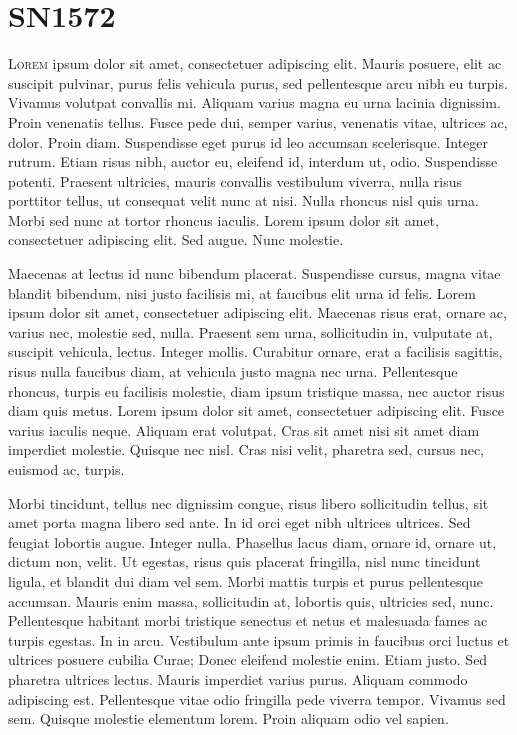 \chapter{SN1572}
\label{chap:two}

\lettrine[lines=4]{L}{orem} ipsum dolor sit amet, consectetuer
adipiscing elit. Mauris posuere, elit ac suscipit pulvinar, purus
felis vehicula purus, sed pellentesque arcu nibh eu turpis. Vivamus
volutpat convallis mi. Aliquam varius magna eu urna lacinia
dignissim. Proin venenatis tellus. Fusce pede dui, semper varius,
venenatis vitae, ultrices ac, dolor. Proin diam. Suspendisse eget
purus id leo accumsan scelerisque. Integer rutrum. Etiam risus nibh,
auctor eu, eleifend id, interdum ut, odio. Suspendisse
potenti. Praesent ultricies, mauris convallis vestibulum viverra,
nulla risus porttitor tellus, ut consequat velit nunc at nisi. Nulla
rhoncus nisl quis urna. Morbi sed nunc at tortor rhoncus
iaculis. Lorem ipsum dolor sit amet, consectetuer adipiscing elit. Sed
augue. Nunc molestie.

Maecenas at lectus id nunc bibendum placerat. Suspendisse cursus,
magna vitae blandit bibendum, nisi justo facilisis mi, at faucibus
elit urna id felis. Lorem ipsum dolor sit amet, consectetuer
adipiscing elit. Maecenas risus erat, ornare ac, varius nec, molestie
sed, nulla. Praesent sem urna, sollicitudin in, vulputate at, suscipit
vehicula, lectus. Integer mollis. Curabitur ornare, erat a facilisis
sagittis, risus nulla faucibus diam, at vehicula justo magna nec
urna. Pellentesque rhoncus, turpis eu facilisis molestie, diam ipsum
tristique massa, nec auctor risus diam quis metus. Lorem ipsum dolor
sit amet, consectetuer adipiscing elit. Fusce varius iaculis
neque. Aliquam erat volutpat. Cras sit amet nisi sit amet diam
imperdiet molestie. Quisque nec nisl. Cras nisi velit, pharetra sed,
cursus nec, euismod ac, turpis.

Morbi tincidunt, tellus nec dignissim congue, risus libero
sollicitudin tellus, sit amet porta magna libero sed ante. In id orci
eget nibh ultrices ultrices. Sed feugiat lobortis augue. Integer
nulla. Phasellus lacus diam, ornare id, ornare ut, dictum non,
velit. Ut egestas, risus quis placerat fringilla, nisl nunc tincidunt
ligula, et blandit dui diam vel sem. Morbi mattis turpis et purus
pellentesque accumsan. Mauris enim massa, sollicitudin at, lobortis
quis, ultricies sed, nunc. Pellentesque habitant morbi tristique
senectus et netus et malesuada fames ac turpis egestas. In in
arcu. Vestibulum ante ipsum primis in faucibus orci luctus et ultrices
posuere cubilia Curae; Donec eleifend molestie enim. Etiam justo. Sed
pharetra ultrices lectus. Mauris imperdiet varius purus. Aliquam
commodo adipiscing est. Pellentesque vitae odio fringilla pede viverra
tempor. Vivamus sed sem. Quisque molestie elementum lorem. Proin
aliquam odio vel sapien.

